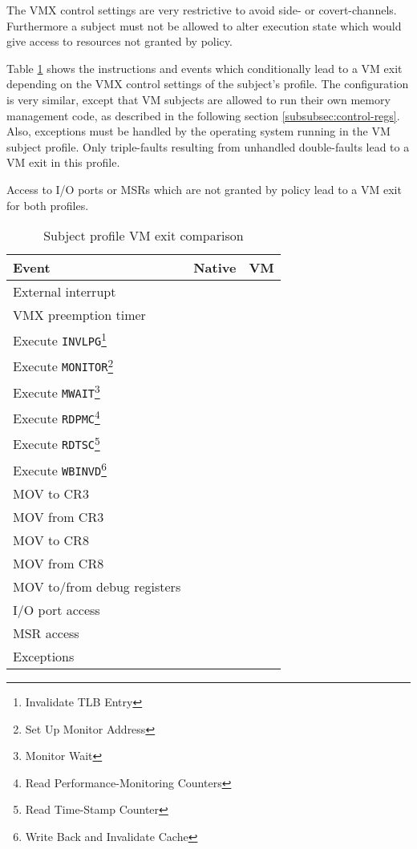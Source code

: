 The VMX control settings are very restrictive to avoid side- or covert-channels.
Furthermore a subject must not be allowed to alter execution state which would
give access to resources not granted by policy.

Table \ref{tab:profiles-cond-vm-exits} shows the instructions and events which
conditionally lead to a VM exit depending on the VMX control settings of the
subject's profile. The configuration is very similar, except that VM subjects
are allowed to run their own memory management code, as described in the
following section \ref{subsubsec:control-regs}. Also, exceptions must be handled
by the operating system running in the VM subject profile. Only triple-faults
resulting from unhandled double-faults lead to a VM exit in this profile.

Access to I/O ports or MSRs which are not granted by policy lead to a
VM exit for both profiles.

\begin{table}[h]
	\centering
	\begin{minipage}[c]{8cm}
	\begin{tabular}{l|c|c}
		\textbf{Event} & \textbf{Native} & \textbf{VM} \\
		\hline
		External interrupt   & \checkmark & \checkmark  \\
		VMX preemption timer & \checkmark & \checkmark  \\
		Execute \texttt{INVLPG}\footnote{Invalidate TLB Entry}
		& \checkmark & \checkmark \\
		Execute \texttt{MONITOR}\footnote{Set Up Monitor Address}
		& \checkmark & \checkmark \\
		Execute \texttt{MWAIT}\footnote{Monitor Wait}
		& \checkmark & \checkmark \\
		Execute \texttt{RDPMC}\footnote{Read Performance-Monitoring Counters}
		& \checkmark & \checkmark \\
		Execute \texttt{RDTSC}\footnote{Read Time-Stamp Counter}
		& \checkmark & \checkmark \\
		Execute \texttt{WBINVD}\footnote{Write Back and Invalidate Cache}
		& \checkmark & \checkmark \\
		MOV to CR3                  & \checkmark & \\
		MOV from CR3                & \checkmark & \\
		MOV to CR8                  & \checkmark & \checkmark \\
		MOV from CR8                & \checkmark & \checkmark \\
		MOV to/from debug registers & \checkmark & \checkmark \\
		\hline
		I/O port access & \checkmark & \checkmark \\
		MSR access      & \checkmark & \checkmark \\
		Exceptions      & \checkmark & \\
	\end{tabular}
	\end{minipage}
	\caption{Subject profile VM exit comparison}
	\label{tab:profiles-cond-vm-exits}
\end{table}

